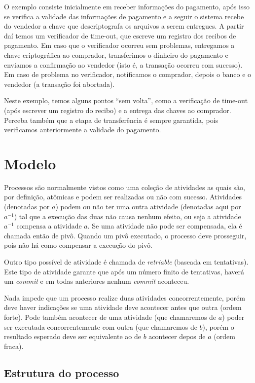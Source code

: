 \documentclass[a4paper,12pt,notitlepage]{article}
\begin{document}
O exemplo consiste inicialmente em receber informações do pagamento, após isso
se verifica a validade das informações de pagamento e a seguir o sistema recebe do vendedor a chave que descriptografa os arquivos a serem entregues. 
A partir daí temos um verificador de time-out, que escreve um registro dos recibos de pagamento. Em caso que o verificador ocorreu sem problemas, entregamos a chave criptográfica ao comprador, transferimos o dinheiro do pagamento e enviamos a confirmação ao vendedor (isto é, a transação ocorreu com sucesso). Em caso de problema no verificador, notificamos o comprador, depois o banco e o vendedor (a transação foi abortada). 

Neste exemplo, temos alguns pontos ``sem volta'', como a verificação de time-out (após escrever um registro do recibo) e a entrega das chaves ao comprador. Perceba também que a etapa de transferência é sempre garantida, pois verificamos anteriormente a validade do pagamento. 


\newpage

\section{Modelo}

Processos são normalmente vistos como uma coleção de atividades as quais são, por definição, atômicas e podem ser realizadas ou não com sucesso. Atividades (denotadas por $a$) podem ou não ter uma outra atividade (denotadas aqui por $a^{-1}$) tal que a execução das duas não causa nenhum efeito, ou seja a atividade $a^{-1}$ compensa a atividade $a$. Se uma atividade não pode
ser compensada, ela é chamada então de pivô. Quando um pivô executado, o processo deve prosseguir, pois não há como compensar a execução do pivô.

Outro tipo possível de atividade é chamada de \textit{retriable} (baseada em tentativas). Este tipo de atividade garante que após um número finito de tentativas, haverá um \textit{commit} e em todas anteriores nenhum \textit{commit} aconteceu.

Nada impede que um processo realize duas atividades concorrentemente, porém deve haver indicações se uma atividade deve acontecer antes que outra (ordem forte). Pode também acontecer de uma atividade (que chamaremos de $a$) poder ser executada concorrentemente com outra (que chamaremos de $b$), porém o resultado esperado deve ser equivalente ao de $b$ acontecer depos de $a$ (ordem fraca).

\subsection{Estrutura do processo}
\end{document}
